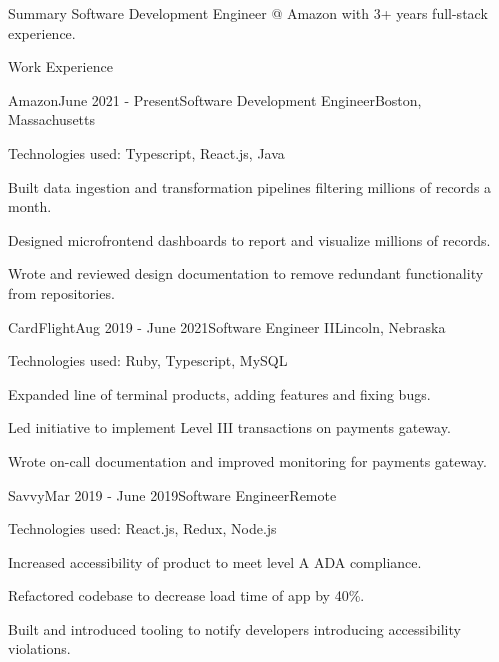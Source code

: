 \documentclass{resume} %
\begin{document}

\begin{rSection}{Summary}
Software Development Engineer @ Amazon with 3+ years full-stack experience.
\end{rSection}


\begin{rSection}{Work Experience}

\begin{rSubsection}{Amazon}{June 2021 - Present}{Software Development Engineer}{Boston, Massachusetts}
\item Technologies used: Typescript, React.js, Java 
\item Built data ingestion and transformation pipelines filtering millions of records a month.
\item Designed microfrontend dashboards to report and visualize millions of records.
\item Wrote and reviewed design documentation to remove redundant functionality from repositories.
\end{rSubsection}

\begin{rSubsection}{CardFlight}{Aug 2019 - June 2021}{Software Engineer II}{Lincoln, Nebraska}
\item Technologies used: Ruby, Typescript, MySQL
\item Expanded line of terminal products, adding features and fixing bugs.
\item Led initiative to implement Level III transactions on payments gateway. 
\item Wrote on-call documentation and improved monitoring for payments gateway.
\end{rSubsection}

\begin{rSubsection}{Savvy}{Mar 2019 - June 2019}{Software Engineer}{Remote}
\item Technologies used: React.js, Redux, Node.js
\item Increased accessibility of product to meet level A ADA compliance.
\item Refactored codebase to decrease load time of app by 40\%.
\item Built and introduced tooling to notify developers introducing accessibility violations.
\end{rSubsection}

\end{rSection}
\end{document}
